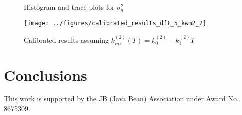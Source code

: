 \documentclass[article]{proc}
\begin{document}
\begin{figure}[b!]
    \centering
    \qquad
    \caption{Histogram and trace plots for $\sigma_q^2$}
    \label{fig:sigma_trace_2}
\end{figure}

\begin{figure}
    \centering
    \texttt{[image: ../figures/calibrated\_results\_dft\_5\_kwm2\_2]}
    \caption{Calibrated results assuming $k^{(2)}_{ins}(T) = k^{(2)}_0 + k^{(2)}_1 T$}
    \label{fig:cal_results_2}
\end{figure}


\section{Conclusions}



\acknowledgements

This work is supported by the JB (Java Bean) Association under Award No. 8675309.


\scriptsize{

}
\end{document}

